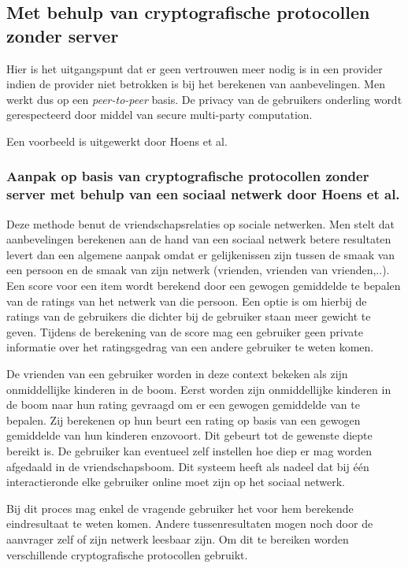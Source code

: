 
\subsection{Met behulp van cryptografische protocollen zonder server}

Hier is het uitgangspunt dat er geen vertrouwen meer nodig is in een provider indien de provider niet betrokken is bij het berekenen van aanbevelingen. Men werkt dus op een \textit{peer-to-peer} basis. De privacy van de gebruikers onderling wordt gerespecteerd door middel van secure multi-party computation.

Een voorbeeld is uitgewerkt door Hoens et al. 


\subsubsection{Aanpak op basis van cryptografische protocollen zonder server met behulp van een sociaal netwerk door Hoens et al. \cite{hoens2010private}}


Deze methode benut de vriendschapsrelaties op sociale netwerken. Men stelt dat aanbevelingen berekenen aan de hand van een sociaal netwerk betere resultaten levert dan een algemene aanpak omdat er gelijkenissen zijn tussen de smaak van een persoon en de smaak van zijn netwerk (vrienden, vrienden van vrienden,..). Een score voor een item wordt berekend door een gewogen gemiddelde te bepalen van de ratings van het netwerk van die persoon. Een optie is om hierbij de ratings van de gebruikers die dichter bij de gebruiker staan meer gewicht te geven. 
Tijdens de berekening van de score mag een gebruiker geen private informatie over het ratingsgedrag van een andere gebruiker te weten komen.

De vrienden van een gebruiker worden in deze context bekeken als zijn onmiddellijke kinderen in de boom. Eerst worden zijn onmiddellijke kinderen in de boom naar hun rating gevraagd om er een gewogen gemiddelde van te bepalen. Zij berekenen op hun beurt een rating op basis van een gewogen gemiddelde van hun kinderen enzovoort. Dit gebeurt tot de gewenste diepte bereikt is. De gebruiker kan eventueel zelf instellen hoe diep er mag worden afgedaald in de vriendschapsboom. Dit systeem heeft als nadeel dat bij één interactieronde elke gebruiker online moet zijn op het sociaal netwerk.

Bij dit proces mag enkel de vragende gebruiker het voor hem berekende eindresultaat te weten komen. Andere tussenresultaten mogen noch door de aanvrager zelf of zijn netwerk leesbaar zijn. Om dit te bereiken worden verschillende cryptografische protocollen gebruikt. 

